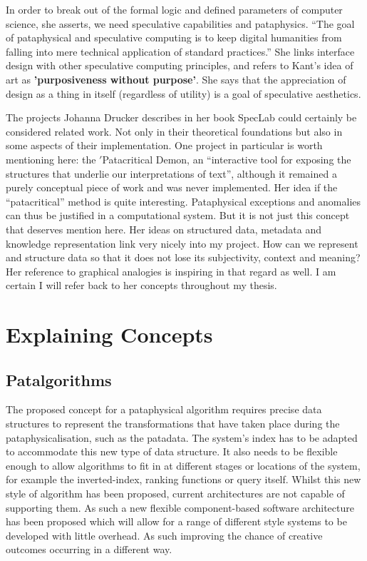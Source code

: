 In order to break out of the formal logic and defined parameters of computer science, she asserts, we need speculative capabilities and pataphysics. ``The goal of pataphysical and speculative computing is to keep digital humanities from falling into mere technical application of standard practices.'' She links interface design with other speculative computing principles, and refers to Kant's idea of art as \textbf{'purposiveness without purpose'}. She says that the appreciation of design as a thing in itself (regardless of utility) is a goal of speculative aesthetics.

The projects Johanna Drucker describes in her book SpecLab \autocite{Drucker2009}  could certainly be considered related work. Not only in their theoretical foundations but also in some aspects of their implementation. One project in particular is worth mentioning here: the $'$Patacritical Demon, an ``interactive tool for exposing the structures that underlie our interpretations of text'', although it remained a purely conceptual piece of work and was never implemented. Her idea if the ``patacritical'' method is quite interesting. Pataphysical exceptions and anomalies can thus be justified in a computational system. But it is not just this concept that deserves mention here.
Her ideas on structured data, metadata and knowledge representation link very nicely into my project. How can we represent and structure data so that it does not lose its subjectivity, context and meaning? Her reference to graphical analogies is inspiring in that regard as well. I am certain I will refer back to her concepts throughout my thesis.


\section{Explaining Concepts}

\subsection{Patalgorithms}

The proposed concept for a pataphysical algorithm requires precise data structures to represent the transformations that have taken place during the pataphysicalisation, such as the patadata. The system’s index has to be adapted to accommodate this new type of data structure. It also needs to be flexible enough to allow algorithms to fit in at different stages or locations of the system, for example the inverted-index, ranking functions or query itself.
Whilst this new style of algorithm has been proposed, current architectures are not capable of supporting them. As such a new flexible component-based software architecture has been proposed which will allow for a range of different style systems to be developed with little overhead. As such improving the chance of creative outcomes occurring in a different way.


